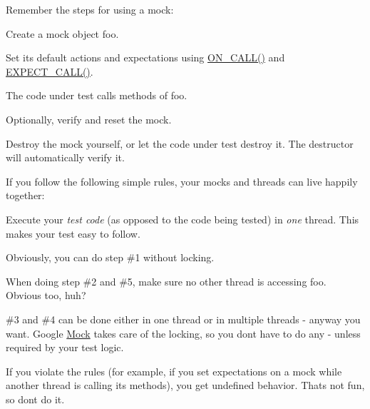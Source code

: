 Remember the steps for using a mock\+:


\begin{DoxyEnumerate}
\item Create a mock object {\ttfamily foo}.
\end{DoxyEnumerate}
\begin{DoxyEnumerate}
\item Set its default actions and expectations using {\ttfamily \mbox{\hyperlink{googletest-master_2googlemock_2include_2gmock_2gmock-spec-builders_8h_a5b12ae6cf84f0a544ca811b380c37334}{O\+N\+\_\+\+C\+A\+L\+L()}}} and {\ttfamily \mbox{\hyperlink{googletest-master_2googlemock_2include_2gmock_2gmock-spec-builders_8h_a535a6156de72c1a2e25a127e38ee5232}{E\+X\+P\+E\+C\+T\+\_\+\+C\+A\+L\+L()}}}.
\end{DoxyEnumerate}
\begin{DoxyEnumerate}
\item The code under test calls methods of {\ttfamily foo}.
\end{DoxyEnumerate}
\begin{DoxyEnumerate}
\item Optionally, verify and reset the mock.
\end{DoxyEnumerate}
\begin{DoxyEnumerate}
\item Destroy the mock yourself, or let the code under test destroy it. The destructor will automatically verify it.
\end{DoxyEnumerate}

If you follow the following simple rules, your mocks and threads can live happily together\+:


\begin{DoxyItemize}
\item Execute your {\itshape test code} (as opposed to the code being tested) in {\itshape one} thread. This makes your test easy to follow.
\item Obviously, you can do step \#1 without locking.
\item When doing step \#2 and \#5, make sure no other thread is accessing {\ttfamily foo}. Obvious too, huh?
\item \#3 and \#4 can be done either in one thread or in multiple threads -\/ anyway you want. Google \mbox{\hyperlink{class_mock}{Mock}} takes care of the locking, so you don\textquotesingle{}t have to do any -\/ unless required by your test logic.
\end{DoxyItemize}

If you violate the rules (for example, if you set expectations on a mock while another thread is calling its methods), you get undefined behavior. That\textquotesingle{}s not fun, so don\textquotesingle{}t do it.

